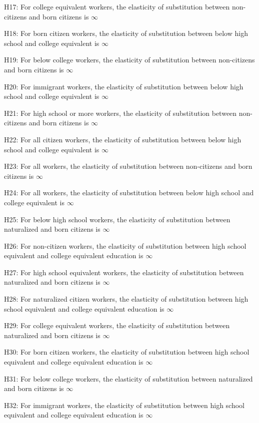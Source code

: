 \documentclass[11pt]{article}
\theoremstyle{definition}
\theoremstyle{remark}
\begin{document}
{H17: For college equivalent workers, the elasticity of substitution between non-citizens and born citizens is $\infty$

H18: For born citizen workers, the elasticity of substitution between below high school and college equivalent is $\infty$

H19: For below college workers, the elasticity of substitution between non-citizens and born citizens is $\infty$

H20: For immigrant workers, the elasticity of substitution between below high school and college equivalent is $\infty$

H21: For high school or more workers, the elasticity of substitution between non-citizens and born citizens is $\infty$

H22: For all citizen workers, the elasticity of substitution between below high school and college equivalent is $\infty$

H23: For all workers, the elasticity of substitution between non-citizens and born citizens is $\infty$

H24: For all workers, the elasticity of substitution between below high school and college equivalent is $\infty$

H25: For below high school workers, the elasticity of substitution between naturalized and born citizens is $\infty$

H26: For non-citizen workers, the elasticity of substitution between high school equivalent and college equivalent education is $\infty$

H27: For high school equivalent workers, the elasticity of substitution between naturalized and born citizens is $\infty$

H28: For naturalized citizen workers, the elasticity of substitution between high school equivalent and college equivalent education is $\infty$

H29: For college equivalent workers, the elasticity of substitution between naturalized and born citizens is $\infty$

H30: For born citizen workers, the elasticity of substitution between high school equivalent and college equivalent education is $\infty$

H31: For below college workers, the elasticity of substitution between naturalized and born citizens is $\infty$

H32: For immigrant workers, the elasticity of substitution between high school equivalent and college equivalent education is $\infty$

}
\end{document}
